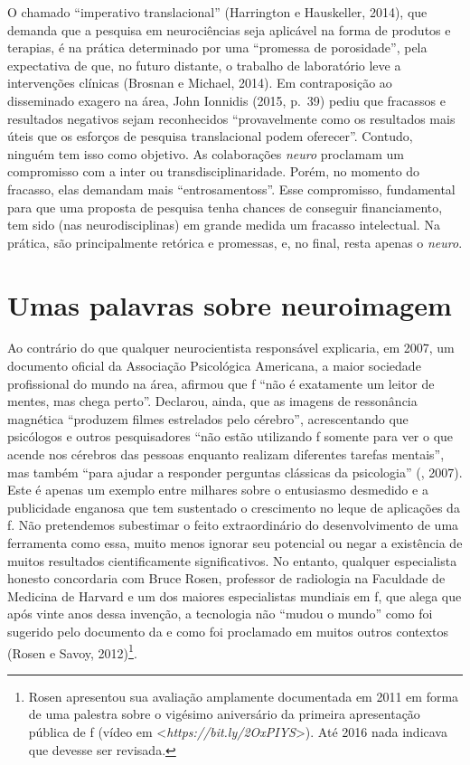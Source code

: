 O chamado ``imperativo translacional'' (Harrington e Hauskeller, 2014),
que demanda que a pesquisa em neurociências seja aplicável na forma de
produtos e terapias, é na prática determinado por uma ``promessa de
porosidade'', pela expectativa de que, no futuro distante, o trabalho de
laboratório leve a intervenções clínicas (Brosnan e Michael, 2014). Em
contraposição ao disseminado exagero na área, John Ionnidis (2015, p.~39)
pediu que fracassos e resultados negativos sejam reconhecidos
``provavelmente como os resultados mais úteis que os esforços de
pesquisa translacional podem oferecer''. Contudo, ninguém tem isso como
objetivo. As colaborações \emph{neuro} proclamam um compromisso com a
inter ou transdisciplinaridade. Porém, no momento do fracasso, elas
demandam mais ``entrosamentoss''. Esse compromisso, fundamental para que
uma proposta de pesquisa tenha chances de conseguir financiamento, tem
sido (nas neurodisciplinas) em grande medida um fracasso intelectual. Na
prática, são principalmente retórica e promessas, e, no final, resta
apenas o \emph{neuro}.

\section{Umas palavras sobre neuroimagem}

Ao contrário do que qualquer neurocientista responsável explicaria, em
2007, um documento oficial da Associação Psicológica Americana, a maior
sociedade profissional do mundo na área, afirmou que f ``não é
exatamente um leitor de mentes, mas chega perto''. Declarou, ainda, que
as imagens de ressonância magnética ``produzem filmes estrelados pelo
cérebro'', acrescentando que psicólogos e outros pesquisadores ``não
estão utilizando f somente para ver o que acende nos cérebros das
pessoas enquanto realizam diferentes tarefas mentais'', mas também
``para ajudar a responder perguntas clássicas da psicologia'' (,
2007). Este é apenas um exemplo entre milhares sobre o entusiasmo
desmedido e a publicidade enganosa que tem sustentado o crescimento no
leque de aplicações da f. Não pretendemos subestimar o feito
extraordinário do desenvolvimento de uma ferramenta como essa, muito
menos ignorar seu potencial ou negar a existência de muitos resultados
cientificamente significativos. No entanto, qualquer especialista
honesto concordaria com Bruce Rosen, professor de radiologia na
Faculdade de Medicina de Harvard e um dos maiores especialistas mundiais
em f, que alega que após vinte anos dessa invenção, a tecnologia não
``mudou o mundo'' como foi sugerido pelo documento da  e como foi
proclamado em muitos outros contextos (Rosen e Savoy,
2012)\footnote[8]{Rosen apresentou sua avaliação amplamente documentada em 2011 em
forma de uma palestra sobre o vigésimo aniversário da primeira
apresentação pública de f (vídeo em \textless{}\emph{https://bit.ly/2OxPIYS}\textgreater{}). Até 2016 nada indicava que
devesse ser revisada.}.

